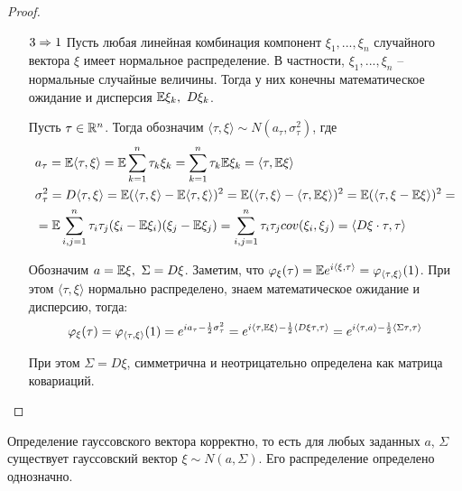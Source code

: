 \begin{proof}
\begin{itemize}
        \item[$3 \Rightarrow 1$] Пусть любая линейная комбинация компонент $\xi_1, ..., \xi_n$ случайного вектора $\xi$ имеет нормальное распределение. В частности, $\xi_1, ..., \xi_n$ -- нормальные случайные величины. Тогда у них конечны математическое ожидание и дисперсия $\E\xi_k,\ D\xi_k$.

        Пусть $\tau \in \mathbb{R}^n$. Тогда обозначим $\langle \tau, \xi \rangle \sim N(a_\tau, \sigma_\tau^2)$, где
        \begin{align*}
            & a_\tau = \mathbb{E} \langle \tau, \xi \rangle = \mathbb{E} \sum_{k=1}^n \tau_k \xi_k = \sum_{k=1}^n \tau_k \mathbb{E}\xi_k = \langle \tau, \mathbb{E}\xi \rangle
            \\
            & \sigma_\tau^2 = D \langle \tau, \xi \rangle = \mathbb{E} (\langle \tau, \xi \rangle - \mathbb{E} \langle \tau, \xi \rangle)^2 = \mathbb{E} (\langle \tau, \xi \rangle - \langle \tau, \mathbb{E}\xi \rangle)^2 = \mathbb{E} (\langle \tau, \xi - \mathbb{E}\xi \rangle)^2 =
            \\
            & = \mathbb{E} \sum_{i, j = 1}^{n} \tau_i \tau_j (\xi_i - \mathbb{E}\xi_i) (\xi_j - \mathbb{E}\xi_j) = \sum_{i, j = 1}^{n} \tau_i \tau_j cov(\xi_i, \xi_j) = \langle D\xi \cdot \tau, \tau \rangle
        \end{align*}

        Обозначим $a = \mathbb{E}\xi,\ \Sigma = D\xi$. Заметим, что $\varphi_\xi(\tau) = \mathbb{E} e^{i \langle \xi, \tau \rangle} = \varphi_{\langle \tau, \xi \rangle}(1)$. При этом $\langle \tau, \xi \rangle$ нормально распределено, знаем математическое ожидание и дисперсию, тогда:
        \large
        \[
            \varphi_\xi(\tau) = \varphi_{\langle \tau, \xi \rangle}(1) = e^{i a_\tau - \frac{1}{2} \sigma_\tau^2} = e^{i \langle \tau, \mathbb{E}\xi \rangle - \frac{1}{2} \langle D\xi \tau, \tau \rangle} = e^{i \langle \tau, a \rangle - \frac{1}{2} \langle \Sigma \tau, \tau \rangle}
        \]
        \normalsize

        При этом $\Sigma = D\xi$, симметрична и неотрицательно определена как матрица ковариаций.
    \end{itemize}
\end{proof}

\begin{corollary}
    Определение гауссовского вектора корректно, то есть для любых заданных $a$, $\Sigma$ существует гауссовский вектор $\xi \sim N(a, \Sigma).$ Его распределение определено однозначно.
\end{corollary}

